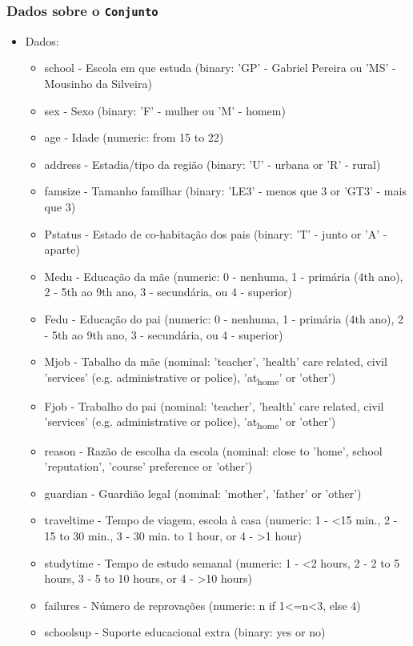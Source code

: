 \documentclass[11pt]{article}
\begin{document}
\subsubsection{Dados sobre o \texttt{Conjunto}}
\label{sec:orgfe5e983}
\begin{itemize}
\item Dados:
\begin{itemize}
\item school - Escola em que estuda (binary: 'GP' - Gabriel Pereira ou 'MS' - Mousinho da Silveira)
\item sex - Sexo (binary: 'F' - mulher ou 'M' - homem)
\item age - Idade (numeric: from 15 to 22)
\item address - Estadia/tipo da região (binary: 'U' - urbana or 'R' - rural)
\item famsize - Tamanho familhar (binary: 'LE3' - menos que  3 or 'GT3' - mais que 3)
\item Pstatus - Estado de co-habitação dos pais (binary: 'T' - junto or 'A' - aparte)
\item Medu - Educação da mãe (numeric: 0 - nenhuma, 1 - primária (4th ano), 2 - 5th ao 9th ano, 3 - secundária, ou 4 - superior)
\item Fedu - Educação do pai (numeric: 0 - nenhuma, 1 - primária (4th ano), 2 - 5th ao 9th ano, 3 - secundária, ou 4 - superior)
\item Mjob - Tabalho da mãe (nominal: 'teacher', 'health' care related, civil 'services' (e.g. administrative or police), 'at\textsubscript{home}' or 'other')
\item Fjob - Trabalho do pai (nominal: 'teacher', 'health' care related, civil 'services' (e.g. administrative or police), 'at\textsubscript{home}' or 'other')
\item reason - Razão de escolha da escola (nominal: close to 'home', school 'reputation', 'course' preference or 'other')
\item guardian - Guardião legal (nominal: 'mother', 'father' or 'other')
\item traveltime - Tempo de viagem, escola à casa (numeric: 1 - <15 min., 2 - 15 to 30 min., 3 - 30 min. to 1 hour, or 4 - >1 hour)
\item studytime - Tempo de estudo semanal (numeric: 1 - <2 hours, 2 - 2 to 5 hours, 3 - 5 to 10 hours, or 4 - >10 hours)
\item failures - Número de reprovações (numeric: n if 1<=n<3, else 4)
\item schoolsup - Suporte educacional extra (binary: yes or no)

\end{itemize}
\end{itemize}
\end{document}
